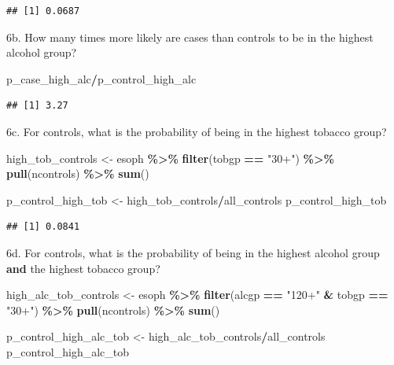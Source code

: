 \documentclass[
]{article}
\newenvironment{Shaded}{\begin{snugshade}}{\end{snugshade}}
\newcommand{\KeywordTok}[1]{\textcolor[rgb]{0.13,0.29,0.53}{\textbf{#1}}}
\newcommand{\NormalTok}[1]{#1}
\newcommand{\OperatorTok}[1]{\textcolor[rgb]{0.81,0.36,0.00}{\textbf{#1}}}
\newcommand{\StringTok}[1]{\textcolor[rgb]{0.31,0.60,0.02}{#1}}
\begin{document}
\begin{verbatim}
## [1] 0.0687
\end{verbatim}

6b. How many times more likely are cases than controls to be in the
highest alcohol group?

\begin{Shaded}
\begin{Highlighting}[]
\NormalTok{p\_case\_high\_alc}\OperatorTok{/}\NormalTok{p\_control\_high\_alc}
\end{Highlighting}
\end{Shaded}

\begin{verbatim}
## [1] 3.27
\end{verbatim}

6c. For controls, what is the probability of being in the highest
tobacco group?

\begin{Shaded}
\begin{Highlighting}[]
\NormalTok{high\_tob\_controls \textless{}{-}}\StringTok{ }\NormalTok{esoph }\OperatorTok{\%\textgreater{}\%}
\StringTok{  }\KeywordTok{filter}\NormalTok{(tobgp }\OperatorTok{==}\StringTok{ "30+"}\NormalTok{) }\OperatorTok{\%\textgreater{}\%}
\StringTok{  }\KeywordTok{pull}\NormalTok{(ncontrols) }\OperatorTok{\%\textgreater{}\%}
\StringTok{  }\KeywordTok{sum}\NormalTok{()}

\NormalTok{p\_control\_high\_tob \textless{}{-}}\StringTok{ }\NormalTok{high\_tob\_controls}\OperatorTok{/}\NormalTok{all\_controls}
\NormalTok{p\_control\_high\_tob}
\end{Highlighting}
\end{Shaded}

\begin{verbatim}
## [1] 0.0841
\end{verbatim}

6d. For controls, what is the probability of being in the highest
alcohol group \textbf{and} the highest tobacco group?

\begin{Shaded}
\begin{Highlighting}[]
\NormalTok{high\_alc\_tob\_controls \textless{}{-}}\StringTok{ }\NormalTok{esoph }\OperatorTok{\%\textgreater{}\%}
\StringTok{  }\KeywordTok{filter}\NormalTok{(alcgp }\OperatorTok{==}\StringTok{ "120+"} \OperatorTok{\&}\StringTok{ }\NormalTok{tobgp }\OperatorTok{==}\StringTok{ "30+"}\NormalTok{) }\OperatorTok{\%\textgreater{}\%}
\StringTok{  }\KeywordTok{pull}\NormalTok{(ncontrols) }\OperatorTok{\%\textgreater{}\%}
\StringTok{  }\KeywordTok{sum}\NormalTok{()}

\NormalTok{p\_control\_high\_alc\_tob \textless{}{-}}\StringTok{ }\NormalTok{high\_alc\_tob\_controls}\OperatorTok{/}\NormalTok{all\_controls}
\NormalTok{p\_control\_high\_alc\_tob}
\end{Highlighting}
\end{Shaded}
\end{document}
